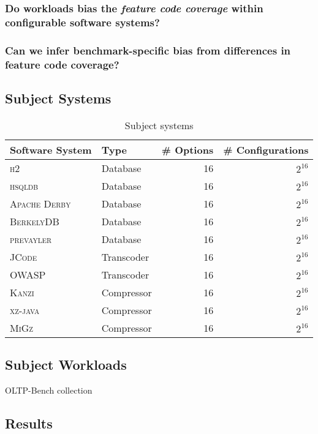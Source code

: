\documentclass[conference]{IEEEtran}
\begin{document}
\subsubsection{Do workloads bias the \emph{feature code coverage} within configurable software systems?}
\subsubsection{Can we infer benchmark-specific bias from differences in feature code coverage?}

\subsection{Subject Systems}
\begin{table}
	\centering
	\caption{Subject systems}
	\begin{tabular}{llrr}
		\toprule
		\textbf{Software System} & \textbf{Type} & \textbf{\# Options} & \textbf{\# Configurations} \\
		\midrule
		\textsc{h2} & Database & 16 & $2^{16}$\\
		\textsc{hsqldb} & Database & 16 & $2^{16}$\\
		\textsc{Apache Derby} & Database & 16 & $2^{16}$\\
		\textsc{BerkelyDB} & Database & 16 & $2^{16}$\\
		\textsc{prevayler} & Database & 16 & $2^{16}$\\
		\midrule
		\textsc{JCode} & Transcoder & 16 & $2^{16}$\\
		\textsc{OWASP} & Transcoder & 16 & $2^{16}$\\
		\midrule
		\textsc{Kanzi} & Compressor & 16 & $2^{16}$\\
		\textsc{xz-java} & Compressor & 16 & $2^{16}$\\
		\textsc{MiGz} &  Compressor & 16 & $2^{16}$\\
		\bottomrule
	\end{tabular}
\end{table}

\subsection{Subject Workloads}
OLTP-Bench collection~\cite{difallah_oltp_2013}

\subsection{Results}
\end{document}
